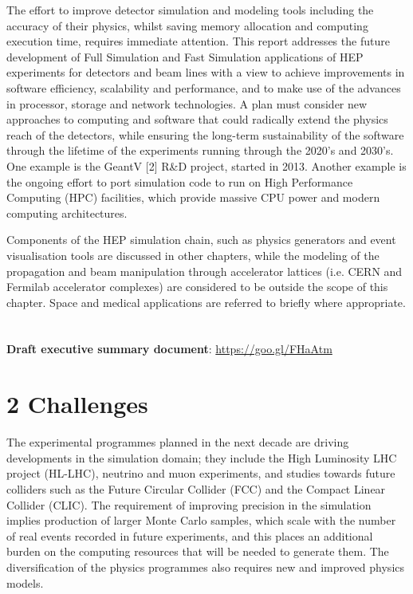 \documentclass[12pt,a4paper]{article}
\begin{document}
The effort to improve detector simulation and modeling tools including
the accuracy of their physics, whilst saving memory allocation and
computing execution time, requires immediate attention. This report
addresses the future development of Full Simulation and Fast Simulation
applications of HEP experiments for detectors and beam lines with a view
to achieve improvements in software efficiency, scalability and
performance, and to make use of the advances in processor, storage and
network technologies. A plan must consider new approaches to computing
and software that could radically extend the physics reach of the
detectors, while ensuring the long-term sustainability of the software
through the lifetime of the experiments running through the 2020's and
2030's. One example is the GeantV {[}2{]} R\&D project, started in 2013.
Another example is the ongoing effort to port simulation code to run on
High Performance Computing (HPC) facilities, which provide massive CPU
power and modern computing architectures.

Components of the HEP simulation chain, such as physics generators and
event visualisation tools are discussed in other chapters, while the
modeling of the propagation and beam manipulation through accelerator
lattices (i.e. CERN and Fermilab accelerator complexes) are considered
to be outside the scope of this chapter. Space and medical applications
are referred to briefly where appropriate.

\hypertarget{section}{%
\section{}\label{section}}

\textbf{Draft executive summary document}:
\href{https://goo.gl/FHaAtm}{{https://goo.gl/FHaAtm}}

\hypertarget{challenges}{%
\section{2 Challenges}\label{challenges}}

The experimental programmes planned in the next decade are driving
developments in the simulation domain; they include the High Luminosity
LHC project (HL-LHC), neutrino and muon experiments, and studies towards
future colliders such as the Future Circular Collider (FCC) and the
Compact Linear Collider (CLIC). The requirement of improving precision
in the simulation implies production of larger Monte Carlo samples,
which scale with the number of real events recorded in future
experiments, and this places an additional burden on the computing
resources that will be needed to generate them. The diversification of
the physics programmes also requires new and improved physics models.
\end{document}
